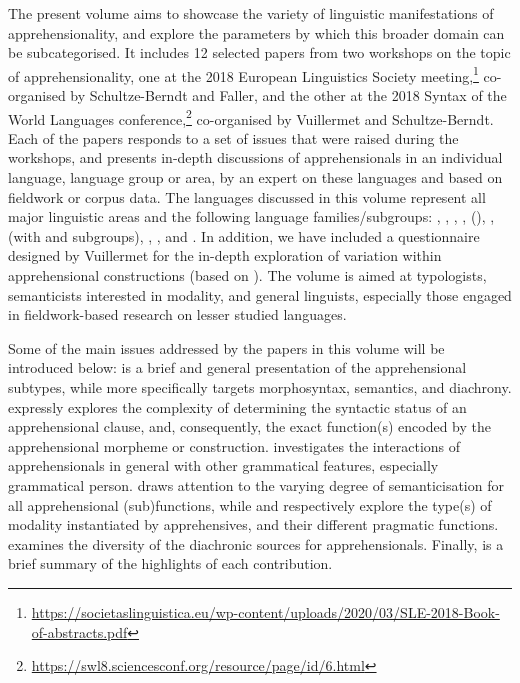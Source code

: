 \documentclass[output=paper,colorlinks,citecolor=brown]{langscibook}
\begin{document}
The present volume aims to showcase the variety of linguistic manifestations of apprehensionality, and explore the parameters by which this broader domain can be subcategorised. It includes 12 selected papers from two workshops on the topic of apprehensionality, one at the 2018 European Linguistics Society meeting,\footnote{\url{https://societaslinguistica.eu/wp-content/uploads/2020/03/SLE-2018-Book-of-abstracts.pdf}} co-organised by Schultze-Berndt and Faller, and the other at the 2018 Syntax of the World Languages conference,\footnote{\url{https://swl8.sciencesconf.org/resource/page/id/6.html}} co-organised by Vuillermet and Schultze-Berndt. Each of the papers responds to a set of issues that were raised during the workshops, and presents in-depth discussions of apprehensionals in an individual language, language group or area, by an expert on these languages and based on fieldwork or corpus data. The languages discussed in this volume represent all major linguistic areas and the following language families/subgroups: , , , ,  (), ,  (with  and  subgroups), , , and . In addition, we have included a questionnaire designed by Vuillermet for the in-depth exploration of variation within apprehensional constructions (based on \cite{VuillermetM2018questionnaire}). The volume is aimed at typologists, semanticists interested in modality, and general linguists, especially those engaged in fieldwork-based research on lesser studied languages.

Some of the main issues addressed by the papers in this volume will be introduced below:  is a brief and general presentation of the apprehensional subtypes, while  more specifically targets morphosyntax,  semantics, and  diachrony.  expressly explores the complexity of determining the syntactic status of an apprehensional clause, and, consequently, the exact function(s) encoded by the apprehensional morpheme or construction.  investigates the interactions of apprehensionals in general with other grammatical features, especially grammatical person.  draws attention to the varying degree of semanticisation for all apprehensional (sub)functions, while  and  respectively explore the type(s) of modality instantiated by apprehensives, and their different pragmatic functions.  examines the diversity of the diachronic sources for apprehensionals. Finally,  is a brief summary of the highlights of each contribution.
\end{document}
